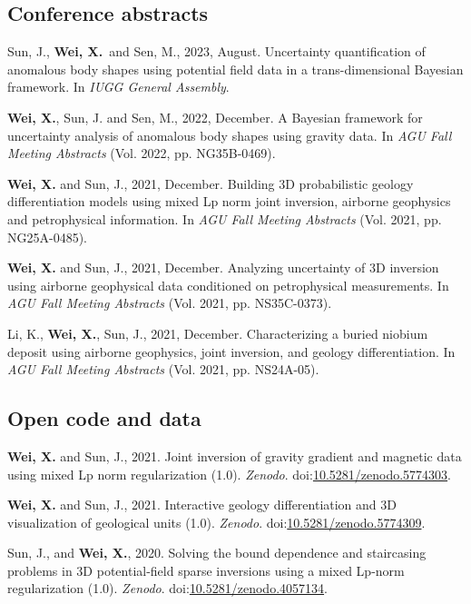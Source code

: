 \documentclass[11pt, a4paper]{article}
\newcommand{\LastName}{Wei}
\newcommand{\Initials}{X}
\newcommand{\Wei}{\textbf{\LastName, \Initials.}}  %
\newcommand{\WeiSun}{\textbf{\LastName, \Initials.} and Sun, J.}  %
\newcommand{\DOI}[1]{doi:\href{https://doi.org/#1}{#1}}
\begin{document}
\subsection*{Conference abstracts}
\begin{etaremune}
	
	\item
	Sun, J., \Wei \, and Sen, M., 2023, August. Uncertainty quantification of anomalous body shapes using potential field data in a trans-dimensional Bayesian framework. In \emph{IUGG General Assembly}.
	
	\item
	\Wei, Sun, J. and Sen, M., 2022, December. A Bayesian framework for uncertainty analysis of anomalous body shapes using gravity data. In \emph{AGU Fall Meeting Abstracts} (Vol. 2022, pp. NG35B-0469).

	\item
	\WeiSun, 2021, December. Building 3D probabilistic geology differentiation models using mixed Lp norm joint inversion, airborne geophysics and petrophysical information. In \emph{AGU Fall Meeting Abstracts} (Vol. 2021, pp. NG25A-0485). 

	\item
	\WeiSun, 2021, December. Analyzing uncertainty of 3D inversion using airborne geophysical data conditioned on petrophysical measurements. In \emph{AGU Fall Meeting Abstracts} (Vol. 2021, pp. NS35C-0373). 

	\item
	Li, K., \Wei, Sun, J., 2021, December. Characterizing a buried niobium deposit using airborne geophysics, joint inversion, and geology differentiation. In \emph{AGU Fall Meeting Abstracts} (Vol. 2021, pp. NS24A-05). 

\end{etaremune}


\subsection*{Open code and data}
\begin{etaremune}

	\item
	\WeiSun, 2021. Joint inversion of gravity gradient and magnetic data using mixed Lp norm regularization (1.0). \emph{Zenodo}. \DOI{10.5281/zenodo.5774303}.

	\item
	\WeiSun, 2021. Interactive geology differentiation and 3D visualization of geological units (1.0). \emph{Zenodo}. \DOI{10.5281/zenodo.5774309}.

	\item
	Sun, J., and \Wei, 2020. Solving the bound dependence and staircasing problems in 3D potential-field sparse inversions using a mixed Lp-norm regularization (1.0). \emph{Zenodo}. \DOI{10.5281/zenodo.4057134}.

\end{etaremune}
\end{document}
